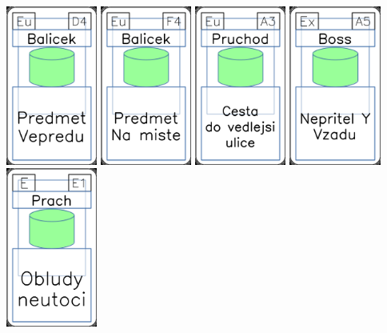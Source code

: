 \documentclass[a4paper]{article}
\begin{document}
	\includegraphics[width=3.0cm]{img-4_18}
	\includegraphics[width=3.0cm]{img-4_28}
	\includegraphics[width=3.0cm]{img-4_32}
	\includegraphics[width=3.0cm]{img-4_4}
	\includegraphics[width=3.0cm]{img-4_50}
\end{document}

